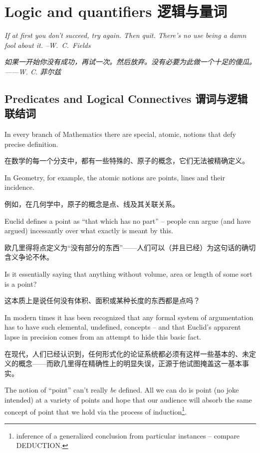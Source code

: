 
\chapter{Logic and quantifiers 逻辑与量词}
\label{ch:logic}

{\em If at first you don't succeed, try again.  Then quit.
There's no use being a damn fool about it. --W.\ C.\ Fields}

{\em 如果一开始你没有成功，再试一次。然后放弃。没有必要为此做一个十足的傻瓜。——W. C. 菲尔兹}

\section{Predicates and Logical Connectives 谓词与逻辑联结词}
\label{sec:pred}

In every branch of Mathematics there are special, 
atomic, notions that
defy precise definition.

在数学的每一个分支中，都有一些特殊的、原子的概念，它们无法被精确定义。

In Geometry, for example, the atomic notions
are points, lines and their incidence.

例如，在几何学中，原子的概念是点、线及其关联关系。

Euclid defines a point as
``that which has no part'' -- people can argue (and have argued) incessantly
over what exactly is meant by this.

欧几里得将点定义为“没有部分的东西”——人们可以（并且已经）为这句话的确切含义争论不休。

Is it essentially saying that anything 
without volume, area or length of some sort is a point?

这本质上是说任何没有体积、面积或某种长度的东西都是点吗？

In modern times
it has been recognized that any formal system of argumentation has to
have such elemental, undefined, concepts -- and that Euclid's apparent
lapse in precision comes from an attempt to hide this basic fact.

在现代，人们已经认识到，任何形式化的论证系统都必须有这样一些基本的、未定义的概念——而欧几里得在精确性上的明显失误，正源于他试图掩盖这一基本事实。

The notion of ``point'' can't really {\em be} defined.  All we can do
is point (no joke intended) at a variety of points and hope that our
audience will absorb the same concept of point that we hold via the 
process of induction\footnote{inference of a %
generalized conclusion from particular instances -- compare DEDUCTION. }.


